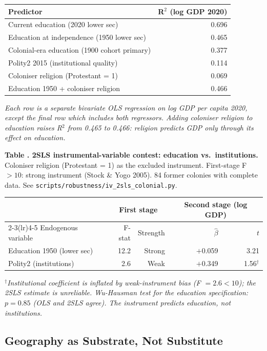 \documentclass[12pt,letterpaper]{article}
\begin{document}
{\begin{longtable}[]{@{}lr@{}}
\toprule
Predictor & R$^2$ (log GDP 2020) \\
\midrule
\endhead
Current education (2020 lower sec) & 0.696 \\
Education at independence (1950 lower sec) & 0.465 \\
Colonial-era education (1900 cohort primary) & 0.377 \\
Polity2 2015 (institutional quality) & 0.114 \\
Coloniser religion (Protestant = 1) & 0.069 \\
Education 1950 + coloniser religion & 0.466 \\
\bottomrule
\end{longtable}

\emph{Each row is a separate bivariate OLS regression on log GDP per
capita 2020, except the final row which includes both regressors.
Adding coloniser religion to education raises R$^2$ from 0.465 to
0.466: religion predicts GDP only through its effect on education.}

\label{tab:a7}\textbf{Table \thetable. 2SLS instrumental-variable contest: education vs.\ institutions.}
Coloniser religion (Protestant = 1) as the excluded instrument.
First-stage F $> 10$: strong instrument (Stock \& Yogo 2005).
84 former colonies with complete data. See
\texttt{scripts/robustness/iv\_2sls\_colonial.py}.

{\small
\begin{longtable}[]{@{}lrrrr@{}}
\toprule
 & \multicolumn{2}{c}{First stage} & \multicolumn{2}{c}{Second stage (log GDP)} \\
\cmidrule(lr){2-3}\cmidrule(lr){4-5}
Endogenous variable & F-stat & Strength & $\hat\beta$ & $t$ \\
\midrule
\endhead
Education 1950 (lower sec) & 12.2 & Strong & $+$0.059 & 3.21 \\
Polity2 (institutions) & 2.6 & Weak & $+$0.349 & 1.56$^{\dagger}$ \\
\bottomrule
\end{longtable}
}

\emph{$^{\dagger}$Institutional coefficient is inflated by weak-instrument
bias (F $= 2.6 < 10$); the 2SLS estimate is unreliable.
Wu-Hausman test for the education specification: $p = 0.85$ (OLS and 2SLS
agree). The instrument predicts education, not institutions.}

\subsection{Geography as Substrate, Not Substitute}\label{geography-as-substrate-not-substitute}

}
\end{document}
